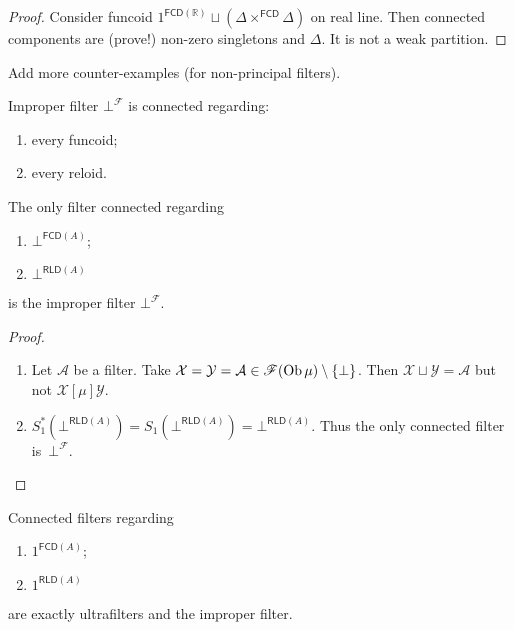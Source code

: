 \begin{proof}
  Consider funcoid $1^{\mathsf{FCD}(\mathbb{R})}\sqcup(\Delta \times^{\mathsf{FCD}} \Delta)$ on real line.
  Then connected components are (prove!) non-zero singletons and $\Delta$. It
  is not a weak partition.
\end{proof}

Add more counter-examples (for non-principal filters).


\begin{obvious}
Improper filter $\bot^{\mathscr{F}}$ is connected regarding:
\begin{enumerate}
  \item every funcoid;
  \item every reloid.
\end{enumerate}{\hspace*{\fill}}{\medskip}
\end{obvious}

\begin{prop}
  The only filter connected regarding
  \begin{enumerate}
    \item $\bot^{\mathsf{FCD} (A)}$;
    \item $\bot^{\mathsf{RLD} (A)}$
  \end{enumerate}
  is the improper filter $\bot^{\mathscr{F}}$.
\end{prop}

\begin{proof}
  ~
  \begin{enumerate}
    \item Let $\mathcal{A}$ be a filter. Take $\mathcal{X} = \mathcal{Y} =
    \mathcal{A} \in \mathscr{F} (\operatorname{Ob} \mu) \setminus \{ \bot \}$. Then
    $\mathcal{X} \sqcup \mathcal{Y} = \mathcal{A}$ but not $\mathcal{X}
    \mathrel{[\mu]} \mathcal{Y}$.

    \item $S^{\ast}_1 (\bot^{\mathsf{RLD} (A)}) = S_1
    (\bot^{\mathsf{RLD} (A)}) = \bot^{\mathsf{RLD} (A)}$. Thus
    the only connected filter is~$\bot^{\mathscr{F}}$.
  \end{enumerate}
\end{proof}

\begin{prop}
  Connected filters regarding
  \begin{enumerate}
    \item $1^{\mathsf{FCD} (A)}$;

    \item $1^{\mathsf{RLD} (A)}$
  \end{enumerate}
  are exactly ultrafilters and the improper filter.
\end{prop}

